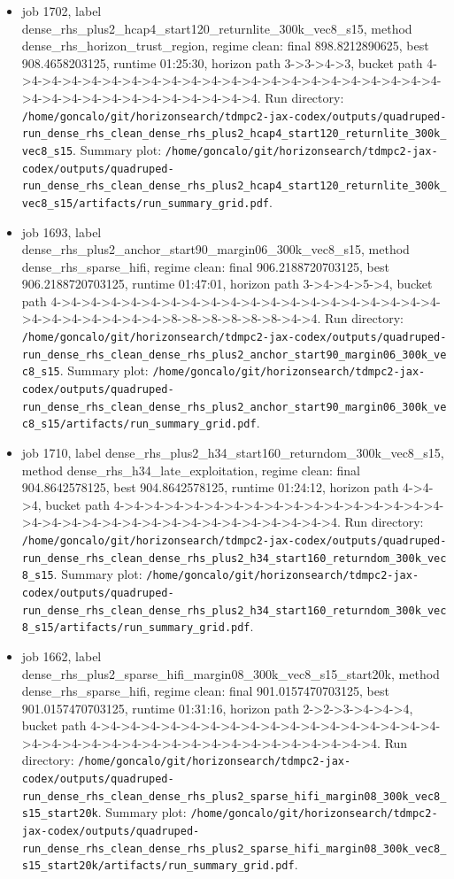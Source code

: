 \begin{itemize}
\item job 1702, label dense\_rhs\_plus2\_hcap4\_start120\_returnlite\_300k\_vec8\_s15, method dense\_rhs\_horizon\_trust\_region, regime clean: final 898.8212890625, best 908.4658203125, runtime 01:25:30, horizon path 3->3->4->3, bucket path 4->4->4->4->4->4->4->4->4->4->4->4->4->4->4->4->4->4->4->4->4->4->4->4->4->4->4->4->4->4->4->4->4->4. Run directory: \texttt{/home/goncalo/git/horizonsearch/tdmpc2-jax-codex/outputs/quadruped-run\_dense\_rhs\_clean\_dense\_rhs\_plus2\_hcap4\_start120\_returnlite\_300k\_vec8\_s15}. Summary plot: \texttt{/home/goncalo/git/horizonsearch/tdmpc2-jax-codex/outputs/quadruped-run\_dense\_rhs\_clean\_dense\_rhs\_plus2\_hcap4\_start120\_returnlite\_300k\_vec8\_s15/artifacts/run\_summary\_grid.pdf}.
\item job 1693, label dense\_rhs\_plus2\_anchor\_start90\_margin06\_300k\_vec8\_s15, method dense\_rhs\_sparse\_hifi, regime clean: final 906.2188720703125, best 906.2188720703125, runtime 01:47:01, horizon path 3->4->4->5->4, bucket path 4->4->4->4->4->4->4->4->4->4->4->4->4->4->4->4->4->4->4->4->4->4->4->4->4->4->4->8->8->8->8->8->8->4->4. Run directory: \texttt{/home/goncalo/git/horizonsearch/tdmpc2-jax-codex/outputs/quadruped-run\_dense\_rhs\_clean\_dense\_rhs\_plus2\_anchor\_start90\_margin06\_300k\_vec8\_s15}. Summary plot: \texttt{/home/goncalo/git/horizonsearch/tdmpc2-jax-codex/outputs/quadruped-run\_dense\_rhs\_clean\_dense\_rhs\_plus2\_anchor\_start90\_margin06\_300k\_vec8\_s15/artifacts/run\_summary\_grid.pdf}.
\item job 1710, label dense\_rhs\_plus2\_h34\_start160\_returndom\_300k\_vec8\_s15, method dense\_rhs\_h34\_late\_exploitation, regime clean: final 904.8642578125, best 904.8642578125, runtime 01:24:12, horizon path 4->4->4, bucket path 4->4->4->4->4->4->4->4->4->4->4->4->4->4->4->4->4->4->4->4->4->4->4->4->4->4->4->4->4->4->4->4->4. Run directory: \texttt{/home/goncalo/git/horizonsearch/tdmpc2-jax-codex/outputs/quadruped-run\_dense\_rhs\_clean\_dense\_rhs\_plus2\_h34\_start160\_returndom\_300k\_vec8\_s15}. Summary plot: \texttt{/home/goncalo/git/horizonsearch/tdmpc2-jax-codex/outputs/quadruped-run\_dense\_rhs\_clean\_dense\_rhs\_plus2\_h34\_start160\_returndom\_300k\_vec8\_s15/artifacts/run\_summary\_grid.pdf}.
\item job 1662, label dense\_rhs\_plus2\_sparse\_hifi\_margin08\_300k\_vec8\_s15\_start20k, method dense\_rhs\_sparse\_hifi, regime clean: final 901.0157470703125, best 901.0157470703125, runtime 01:31:16, horizon path 2->2->3->4->4->4, bucket path 4->4->4->4->4->4->4->4->4->4->4->4->4->4->4->4->4->4->4->4->4->4->4->4->4->4->4->4->4->4->4->4->4->4->4->4. Run directory: \texttt{/home/goncalo/git/horizonsearch/tdmpc2-jax-codex/outputs/quadruped-run\_dense\_rhs\_clean\_dense\_rhs\_plus2\_sparse\_hifi\_margin08\_300k\_vec8\_s15\_start20k}. Summary plot: \texttt{/home/goncalo/git/horizonsearch/tdmpc2-jax-codex/outputs/quadruped-run\_dense\_rhs\_clean\_dense\_rhs\_plus2\_sparse\_hifi\_margin08\_300k\_vec8\_s15\_start20k/artifacts/run\_summary\_grid.pdf}.

\end{itemize}
